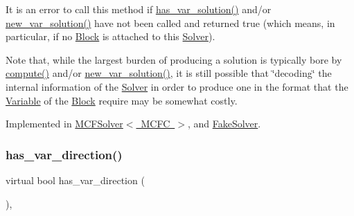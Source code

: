 It is an error to call this method if \mbox{\hyperlink{class_s_m_spp__di__unipi__it_1_1_solver_aa96263f4e0c59225f3f5d54f03fe31ee}{has\+\_\+var\+\_\+solution()}} and/or \mbox{\hyperlink{class_s_m_spp__di__unipi__it_1_1_solver_af109b504a566c90a4ea45c1574c128fe}{new\+\_\+var\+\_\+solution()}} have not been called and returned true (which means, in particular, if no \mbox{\hyperlink{class_s_m_spp__di__unipi__it_1_1_block}{Block}} is attached to this \mbox{\hyperlink{class_s_m_spp__di__unipi__it_1_1_solver}{Solver}}).

Note that, while the largest burden of producing a solution is typically bore by \mbox{\hyperlink{class_s_m_spp__di__unipi__it_1_1_solver_a504d4e3e174c7a518cc66156a8a45ce5}{compute()}} and/or \mbox{\hyperlink{class_s_m_spp__di__unipi__it_1_1_solver_af109b504a566c90a4ea45c1574c128fe}{new\+\_\+var\+\_\+solution()}}, it is still possible that \char`\"{}decoding\char`\"{} the internal information of the \mbox{\hyperlink{class_s_m_spp__di__unipi__it_1_1_solver}{Solver}} in order to produce one in the format that the \mbox{\hyperlink{class_s_m_spp__di__unipi__it_1_1_variable}{Variable}} of the \mbox{\hyperlink{class_s_m_spp__di__unipi__it_1_1_block}{Block}} require may be somewhat costly. 

Implemented in \mbox{\hyperlink{class_s_m_spp__di__unipi__it_1_1_m_c_f_solver_ac83fa9679882440d13fb5940494699c5}{M\+C\+F\+Solver$<$ M\+C\+F\+C $>$}}, and \mbox{\hyperlink{class_s_m_spp__di__unipi__it_1_1_fake_solver_ac83fa9679882440d13fb5940494699c5}{Fake\+Solver}}.

\mbox{\label{class_s_m_spp__di__unipi__it_1_1_solver_a27e8c876f577289e523ebf26aeeb977a}} 
\subsubsection{\texorpdfstring{has\+\_\+var\+\_\+direction()}{has\_var\_direction()}}
{\footnotesize\ttfamily virtual bool has\+\_\+var\+\_\+direction (\begin{DoxyParamCaption}\item[{void}]{ }\end{DoxyParamCaption})\hspace{0.3cm}{\ttfamily [inline]}, {\ttfamily [virtual]}}



